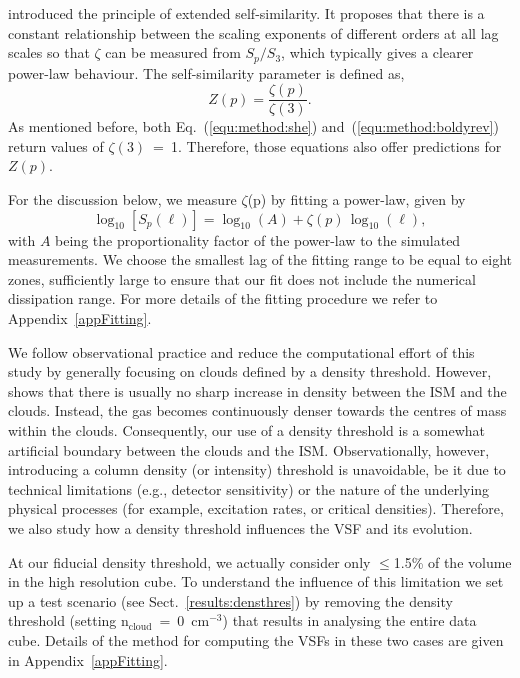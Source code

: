 \citet{Benzi1993} introduced the principle of extended self-similarity.
It proposes that there is a constant relationship between the scaling
exponents of different orders at all lag scales so that $\zeta$ can be measured from $S_p/S_3$, which typically gives a clearer power-law behaviour.
The self-similarity parameter is defined as,
\begin{equation}
	Z(p) = \frac{\zeta(p)}{\zeta(3)}.
	\label{equ:method:z_def}
\end{equation} 
\noindent
As mentioned before, both Eq.~(\ref{equ:method:she}) and~(\ref{equ:method:boldyrev}) return values of $\zeta(3)$~=~1.
Therefore, those equations also offer predictions for $Z(p)$.

For the discussion below, we measure $\zeta$(p) by fitting a power-law, given by
\begin{equation}
	\log_{10}\left[ S_p(\ell) \right] = \log_{10}\left(A\right) + \zeta(p) \, \log_{10}(\ell) ,
	\label{equ:method:fitting}
\end{equation}
with $A$ being the proportionality factor of the power-law to the simulated measurements.
We choose the smallest lag of the fitting range to be equal to eight zones, sufficiently large to ensure that our fit does not include the numerical dissipation range.
For more details of the fitting procedure we refer to Appendix~\ref{appFitting}.

We follow observational practice and reduce the computational effort of this study by generally focusing on clouds defined by a density threshold.
However,  shows that there is usually no sharp increase in density between the ISM and the clouds. 
Instead, the gas becomes continuously denser towards the centres of mass within the clouds. 
Consequently, our use of a density threshold is a somewhat artificial boundary between the clouds and the ISM. Observationally, however, introducing a column density (or intensity) threshold is unavoidable, be it due to technical limitations (e.g., detector sensitivity) or the nature of the underlying physical processes (for example, excitation rates, or critical densities).
Therefore, we also study how a density threshold influences the VSF and its evolution.

At our fiducial density threshold, we actually consider only $\leq$1.5\% of the volume in the high resolution cube.
To understand the influence of this limitation we set up a test scenario (see Sect.~\ref{results:densthres}) by removing the density threshold (setting n$_\mathrm{cloud}$~=~0~cm$^{-3}$) that results in analysing the entire data cube.
Details of the method for computing the VSFs in these two cases are given in Appendix~\ref{appFitting}.

